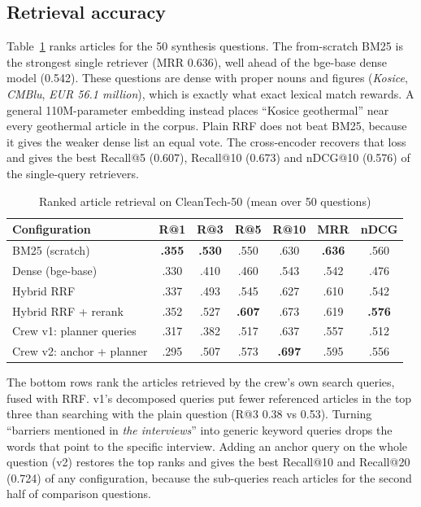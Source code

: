 \documentclass[conference]{IEEEtran}
\begin{document}
\subsection{Retrieval accuracy}
Table~\ref{tab:retrieval} ranks articles for the 50 synthesis questions. The from-scratch BM25 is the
strongest single retriever (MRR 0.636), well ahead of the bge-base dense model (0.542). These questions are
dense with proper nouns and figures (\textit{Kosice}, \textit{CMBlu}, \textit{EUR 56.1 million}), which is
exactly what exact lexical match rewards. A general 110M-parameter embedding instead places ``Kosice
geothermal'' near every geothermal article in the corpus. Plain RRF does not beat BM25, because it gives the weaker
dense list an equal vote. The cross-encoder recovers that loss and gives the best Recall@5 (0.607), Recall@10
(0.673) and nDCG@10 (0.576) of the single-query retrievers.

\begin{table}[t]
\caption{Ranked article retrieval on CleanTech-50 (mean over 50 questions)}
\label{tab:retrieval}
\centering
\setlength{\tabcolsep}{4pt}
\begin{tabular}{lcccccc}
\toprule
Configuration & R@1 & R@3 & R@5 & R@10 & MRR & nDCG \\
\midrule
BM25 (scratch)          & \textbf{.355} & \textbf{.530} & .550 & .630 & \textbf{.636} & .560 \\
Dense (bge-base)        & .330 & .410 & .460 & .543 & .542 & .476 \\
Hybrid RRF              & .337 & .493 & .545 & .627 & .610 & .542 \\
Hybrid RRF + rerank     & .352 & .527 & \textbf{.607} & .673 & .619 & \textbf{.576} \\
\midrule
Crew v1: planner queries  & .317 & .382 & .517 & .637 & .557 & .512 \\
Crew v2: anchor + planner & .295 & .507 & .573 & \textbf{.697} & .595 & .556 \\
\bottomrule
\end{tabular}
\end{table}

The bottom rows rank the articles retrieved by the crew's own search queries, fused with RRF. v1's
decomposed queries put fewer referenced articles in the top three than searching with the plain question (R@3 0.38
vs 0.53). Turning ``barriers mentioned in \emph{the interviews}'' into generic keyword queries drops the words that
point to the specific interview. Adding an anchor query on the whole question (v2) restores the top ranks and gives
the best Recall@10 and Recall@20 (0.724) of any configuration, because the sub-queries reach articles for the second
half of comparison questions.
\end{document}
